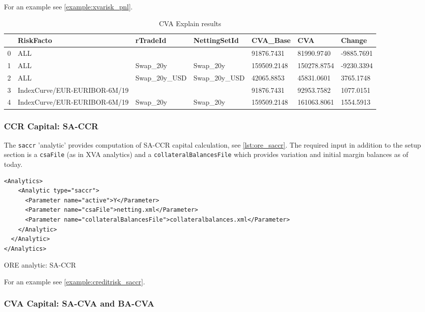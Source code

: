 {For an example see \ref{example:xvarisk_pnl}.

\begin{table}
  \scriptsize
\begin{center}
\begin{tabular}{l|l|l|l|l|l|l}
\hline      
 & RiskFacto&rTradeId&NettingSetId&CVA\_Base&CVA&Change \\
\hline      
0 & ALL&&&91876.7431&81990.9740&-9885.7691 \\
1 & ALL&Swap\_20y&Swap\_20y&159509.2148&150278.8754&-9230.3394 \\
2 & ALL&Swap\_20y\_USD&Swap\_20y\_USD&42065.8853&45831.0601&3765.1748 \\
3 & IndexCurve/EUR-EURIBOR-6M/19&&&91876.7431&92953.7582&1077.0151 \\
4 & IndexCurve/EUR-EURIBOR-6M/19&Swap\_20y&Swap\_20y&159509.2148&161063.8061&1554.5913 \\
\hline      
\end{tabular}
\caption{CVA Explain results}\label{table:cvaexplain}
\end{center}
\end{table}

\subsubsection{CCR Capital: SA-CCR}

The {\tt saccr} 'analytic' provides computation of SA-CCR capital calculation, see \ref{lst:ore_saccr}. The required input in
addition to the setup section is a {\tt csaFile} (as in XVA analytics) and a {\tt collateralBalancesFile} which provides variation and initial margin balances as of today.

\begin{listing}[H]
\begin{verbatim}
<Analytics>
    <Analytic type="saccr">
      <Parameter name="active">Y</Parameter>
      <Parameter name="csaFile">netting.xml</Parameter>
      <Parameter name="collateralBalancesFile">collateralbalances.xml</Parameter>
    </Analytic>
  </Analytic>
</Analytics>
\end{verbatim}
\caption{ORE analytic: SA-CCR}
\label{lst:ore_saccr}
\end{listing}

For an example see \ref{example:creditrisk_saccr}.

\subsubsection{CVA Capital: SA-CVA and BA-CVA}

}
